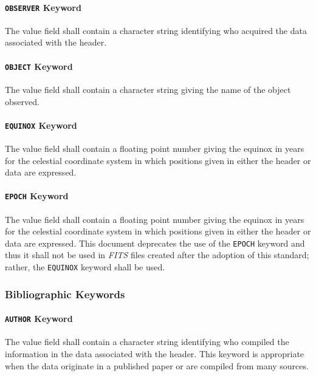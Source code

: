  \paragraph{{\tt OBSERVER} Keyword}
 The value field shall contain a character string
 identifying who acquired the data associated with the header. 
   
 \paragraph{{\tt OBJECT} Keyword}
 The value field shall contain a character 
 string
 giving the name of the object observed.
  
 \paragraph{{\tt EQUINOX} Keyword}
 The value field shall contain a floating point number
 giving the equinox in years for the celestial 
 coordinate system
 in which positions given in either the header or data
 are expressed.
  
 \paragraph{{\tt EPOCH} Keyword}
 The value field shall contain a floating point number
 giving the equinox in years for the celestial 
 coordinate system
 in which positions given in either the header or data
 are expressed.  This document deprecates 
 the use of the {\tt EPOCH} 
 keyword and thus it shall not be used in {\em FITS\/} files
 created after the adoption of this standard; rather, the
 {\tt EQUINOX} keyword shall be used.
  
    \subsubsection{Bibliographic Keywords}
  
 \paragraph{{\tt AUTHOR} Keyword}
 The value field shall contain a character 
 string
 identifying who compiled the information
 in the data associated with the header. This keyword
 is appropriate when the data originate in a published
 paper or are compiled from many sources.
  
